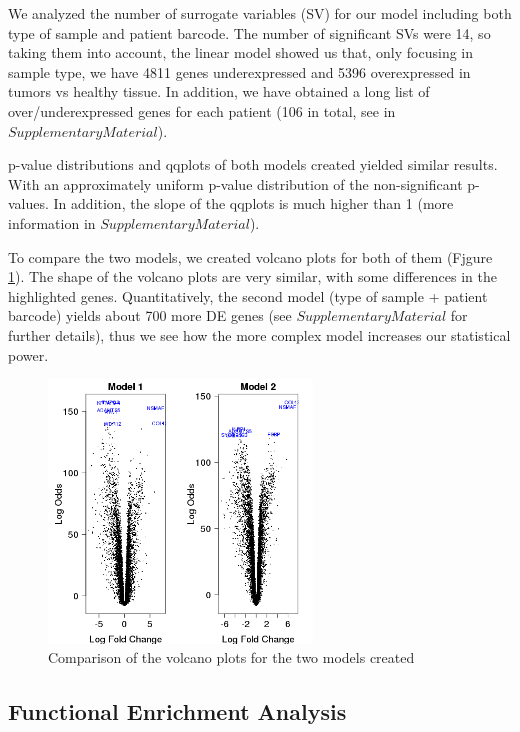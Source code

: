 \documentclass[9pt,twocolumn,twoside]{gsajnl}
\begin{document}
We analyzed the number of surrogate variables (SV) for our model including both type of sample and patient barcode. The number of significant SVs were 14, so taking them into account, the linear model showed us that, only focusing in sample type, we have 4811 genes underexpressed and 5396 overexpressed in tumors vs healthy tissue. In addition, we have obtained a long list of over/underexpressed genes for each patient (106 in total, see in $Supplementary Material$).
\vspace{2mm}

p-value distributions and qqplots of both models created yielded similar results. With an approximately uniform p-value distribution of the non-significant p-values. In addition, the slope of the qqplots is much higher than 1 (more information in $Supplementary Material$). 
\vspace{2mm}

To compare the two models, we created volcano plots for both of them (Fjgure \ref{fig:spectrum}). The shape of the volcano plots are very similar, with some differences in the highlighted genes. Quantitatively, the second model (type of sample + patient barcode) yields about 700 more DE genes (see $Supplementary Material$ for further details), thus we see how the more complex model increases our statistical power.

\begin{figure}[htbp]
\centering
\includegraphics[width=70mm]{volcanotex-1}
\caption{Comparison of the volcano plots for the two models created }%
\label{fig:spectrum}
\end{figure}

\subsection*{Functional Enrichment Analysis} 
\vspace{2mm}
\end{document}
